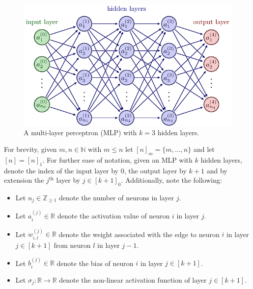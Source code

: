 \documentclass[11pt]{article}
\begin{document}
\begin{figure}[ht]
    \centering
    \includegraphics[width=1\linewidth]{./figures/neural_nets/MLP_1.pdf}
    \caption{A multi-layer perceptron (MLP) with $k=3$ hidden layers.}
    \label{fig:MLP}
\end{figure}

For brevity, given $m,n\in\mathbb{N}$ with $m\leq n$ let $[n]_m=\{m,\dots,n\}$ and let $[n]=[n]_1$. For further ease of notation, given an MLP with $k$ hidden layers, denote the index of the input layer by $0$, the output layer by $k+1$ and by extension the $j^{\text{th}}$ layer by $j\in[k+1]_0$. Additionally, note the following:
\begin{itemize}
    \item Let $n_j\in\mathbb{Z}_{\geq1}$ denote the number of neurons in layer $j$.
    \item Let $a_i^{(j)}\in\mathbb{R}$ denote the activation value of neuron $i$ in layer $j$.
    \item Let $w_{i,l}^{(j)}\in\mathbb{R}$ denote the weight associated with the edge to neuron $i$ in layer $j\in[k+1]$ from neuron $l$ in layer $j-1$.
    \item Let $b_i^{(j)}\in\mathbb{R}$ denote the bias of neuron $i$ in layer $j\in[k+1]$.
    \item Let $\sigma_j:\mathbb{R}\rightarrow\mathbb{R}$ denote the non-linear activation function of layer $j\in[k+1]$.
\end{itemize}
\end{document}
